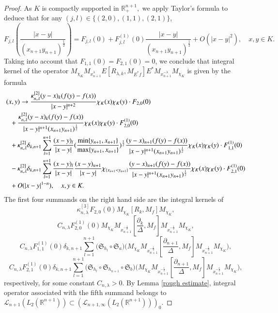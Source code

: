 \documentclass{amsart}
\begin{document}
\begin{proof}
As $K$ is compactly supported in $\mathbb{R}^{n+1}_+,$ we apply Taylor's formula to deduce that for any $(j,l)\in \{(2,0),(1,1),(2,1)\}$,
$$F_{j,l}(\frac{|x-y|}{(x_{n+1}y_{n+1})^{\frac12}})=F_{j,l}(0)+F_{j,l}^{(1)}(0)\frac{|x-y|}{(x_{n+1}y_{n+1})^{\frac12}}+O(|x-y|^2),\quad x,y\in K.$$
Taking into account that $F_{1,1}(0)=F_{2,1}(0)=0$, we conclude that integral kernel of the operator $M_{\chi_K} M_{x_{n+1}^{\lambda}}E[R_{\lambda,k},M_{E^{\ast}f}]E^{\ast}M_{x_{n+1}^{-\lambda}} M_{\chi_K}$ is given by the formula
\begin{align*}
(x,y)&\to\frac{\kappa^{[2]}_{n,\lambda}(y-x)_k(f(y)-f(x))}{|x-y|^{n+2}}\chi_K(x)\chi_K(y)\cdot F_{2,0}(0)\\
&\hspace{-0.5cm}+\frac{\kappa^{[2]}_{n,\lambda}(y-x)_k(f(y)-f(x))}{|x-y|^{n+1}(x_{n+1}y_{n+1})^{\frac12}}\chi_K(x)\chi_K(y)\cdot F_{2,0}^{(1)}(0)\\
&\hspace{-0.5cm}+\kappa^{[2]}_{n,\lambda}\delta_{k,n+1}\sum_{l=1}^{n+1} \frac{(x-y)_l}{|x-y|}(\frac{\min\{y_{n+1},x_{n+1}\}}{\max\{y_{n+1},x_{n+1}\}})^{\frac12} \frac{(y-x)_{n+1}(f(y)-f(x))}{|x-y|^{n+1}(x_{n+1}y_{n+1})^{\frac12}}\chi_K(x)\chi_K(y)\cdot F_{1,1}^{(1)}(0)\\
&\hspace{-0.5cm}-\kappa^{[2]}_{n,\lambda}\delta_{k,n+1}\sum_{l=1}^{n+1} \frac{(x-y)_l}{|x-y|}\frac{(x-y)_{n+1}}{|x-y|}\chi_{\{x_{n+1}<y_{n+1}\}} \frac{(y-x)_{n+1}(f(y)-f(x))}{|x-y|^{n+1}(x_{n+1}y_{n+1})^{\frac12}}\chi_K(x)\chi_K(y)\cdot F_{2,1}^{(1)}(0)\\
&\hspace{-0.5cm}+O(|x-y|^{1-n}),\quad x,y\in K.
\end{align*}
The first four summands on the right hand side are the integral kernels of
$$\kappa^{[3]}_{n,\lambda}F_{2,0}(0)M_{\chi_K}[R_k,M_f]M_{\chi_K},$$
$$C_{n,\lambda}F_{2,0}^{(1)}(0)M_{\chi_K}M_{x_{n+1}^{-\frac12}}[\frac{\partial_k}{\Delta},M_f]M_{x_{n+1}^{-\frac12}}M_{\chi_K},$$
$$C_{n,\lambda}F_{1,1}^{(1)}(0)\delta_{k,n+1}\sum_{l=1}^{n+1}\Big(\mathfrak{S}_{h_l}\circ\mathfrak{S}_a\Big)\Big(M_{\chi_K}M_{x_{n+1}^{-\frac12}}[\frac{\partial_{n+1}}{\Delta},M_f]M_{x_{n+1}^{-\frac12}}M_{\chi_K}\Big),$$
$$C_{n,\lambda}F_{2,1}^{(1)}(0)\delta_{k,n+1}\sum_{l=1}^{n+1}\Big(\mathfrak{S}_{h_l}\circ\mathfrak{S}_{h_{n+1}}\circ\mathfrak{S}_b\Big)\Big(M_{\chi_K}M_{x_{n+1}^{-\frac12}}[\frac{\partial_{n+1}}{\Delta},M_f]M_{x_{n+1}^{-\frac12}}M_{\chi_K}\Big),$$
respectively, for some constant $C_{n,\lambda}>0$. By Lemma \ref{rough estimate}, integral operator associated with the fifth summand belongs to  $\mathcal{L}_{n+1}(L_2(\mathbb{R}^{n+1}))\subset (\mathcal{L}_{n+1,\infty}(L_2(\mathbb{R}^{n+1})))_0.$


\end{proof}
\end{document}
